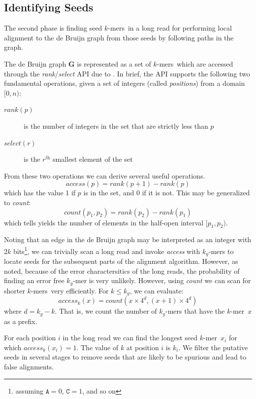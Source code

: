 \documentclass[twocolumn]{article}
\newcommand{\kmer}{$k$-mer}
\newcommand{\kmers}{$k$-mers}
\begin{document}
\subsection{Identifying Seeds}
\label{sec:seeds}

The second phase is finding seed \kmers\ in a long read for performing local
alignment to the de Bruijn graph from those seeds by following paths in the graph.

The de Bruijn graph $\mathbf{G}$ is represented as a set of \kmers\ which are accessed through the
\textit{rank}/\textit{select} API due to \cite{Jacobson89}. In brief, the API supports
the following two fundamental operations, given a set of integers (called \textit{positions})
from a domain $[0,n)$:
\begin{description}
\item[$\textit{rank}(p)$] is the number of integers in the set that are strictly less than $p$
\item[$\textit{select}(r)$] is the $r^\textit{th}$ smallest element of the set
\end{description}

From these two operations we can derive several useful operations.
$$
    \textit{access}(p) = \textit{rank}(p + 1) - \textit{rank}(p)
$$
which has the value 1 if $p$ is in the set, and 0 if it is not.
This may be generalized to \textit{count}:
$$
    \textit{count}(p_1, p_2) = \textit{rank}(p_2) - \textit{rank}(p_1)
$$
which tells yields the number of elements in the half-open interval $[p_1, p_2)$.

Noting that an edge in the de Bruijn graph may be interpreted as an integer with
$2k$ bits\footnote{assuming $\texttt{A} = 0$, $\texttt{C} = 1$, and so on},
we can trivially scan a long read and invoke \textit{access} with $k_g$-mers to locate seeds for the subsequent
parts of the alignment algorithm. However, as noted, because of the error charactersitics of the long
reads, the probability of finding an error free $k_g$-mer is very unlikely. However, using \textit{count}
we can scan for shorter \kmers\ very efficiently. For $k \le k_g$, we can evaluate:
$$
    \textit{access}_k(x) = \textit{count}(x \times 4^d, (x+1) \times 4^d)
$$
where $d = k_g - k$. That is, we count the number of $k_g$-mers that have the \kmer\ $x$ as a prefix.

For each position $i$ in the long read we can find the longest seed \kmer\ $x_i$ for which
$\textit{access}_k(x_i) = 1$.
The value of $k$ at position $i$ is $k_i$.
We filter the putative seeds in several stages to remove seeds that are likely to be spurious and lead to false alignments.
\end{document}
